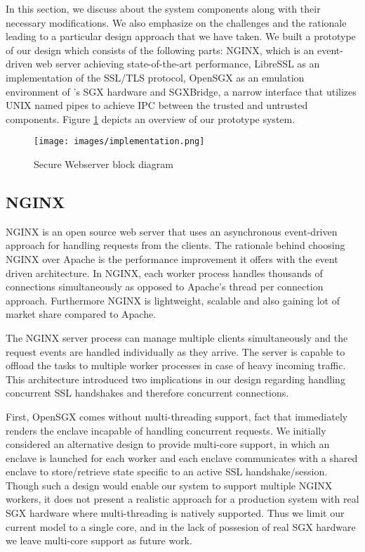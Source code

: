 \documentclass[../main.tex]{subfiles}
\begin{document}
In this section, we discuss about the system components along with their
necessary modifications. We also emphasize on the challenges and the rationale
leading to a particular design approach that we have taken. We built a 
prototype of our design which consists of the following parts: NGINX, 
which is an event-driven web server achieving state-of-the-art performance,
LibreSSL as an implementation of the SSL/TLS protocol, OpenSGX as an emulation
environment of \Intel's SGX hardware and SGXBridge, a narrow interface that
utilizes UNIX named pipes to achieve IPC between the trusted and untrusted
components. Figure \ref{fig:implementation-overview} depicts an overview of our
prototype system.

\begin{figure}[H]
  \centering
  \texttt{[image: images/implementation.png]}
  \caption{Secure Webserver block diagram }
  \label{fig:implementation-overview}
\end{figure}

\subsection{NGINX}

NGINX is an open source web server that uses an asynchronous event-driven
approach for handling requests from the clients. The rationale behind choosing
NGINX over Apache is the performance improvement it offers with the event
driven architecture. In NGINX, each worker process handles thousands of
connections simultaneously as opposed to Apache's thread per connection
approach. Furthermore NGINX is lightweight, scalable and also gaining lot of
market share compared to Apache.

The NGINX server process can manage multiple clients simultaneously and the
request events are handled individually as they arrive. The server is capable
to offload the tasks to multiple worker processes in case of heavy incoming
traffic. This architecture introduced two implications in our design regarding
handling concurrent SSL handshakes and therefore concurrent connections.

First, OpenSGX comes without multi-threading support, fact that immediately
renders the enclave incapable of handling concurrent requests. We initially
considered an alternative design to provide multi-core support, in which an
enclave is launched for each worker and each enclave communicates with a shared
enclave to store/retrieve state specific to an active SSL handshake/session.
Though such a design would enable our system to support multiple NGINX workers,
it does not present a realistic approach for a production system with real SGX
hardware where multi-threading is natively supported. Thus we limit our current
model to a single core, and in the lack of possesion of real SGX hardware we
leave multi-core support as future work.
\end{document}

